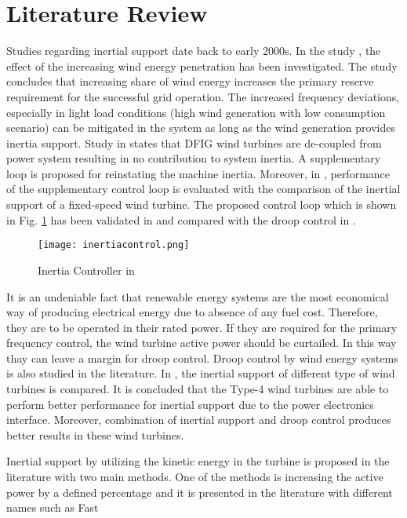 \section{Literature Review}
Studies regarding inertial support date back to early 2000s. In the study \cite{Lalor2004}, the effect of the increasing wind energy penetration has been investigated. The study concludes that increasing share of wind energy increases the primary reserve requirement for the successful grid operation. The increased frequency deviations, especially in light load conditions (high wind generation with low consumption scenario) can be mitigated in the system as long as the wind generation provides inertia support. Study in \cite{Ekanayake2003} states that DFIG wind turbines are de-coupled from power system resulting in no contribution to system inertia. A supplementary loop is proposed for reinstating the machine inertia. Moreover, in \cite{Ekanayake2004}, performance of the  supplementary control loop is evaluated with the comparison of the inertial support of a fixed-speed wind turbine. The proposed control loop which is shown in Fig. \ref{inertiacontrol} has been validated in \cite{Morren2006} and compared with the droop control in \cite{Morren2006a}.\par
\begin{figure}[h!]
	\centering
	\texttt{[image: inertiacontrol.png]}
	\caption{Inertia Controller in \cite{Morren2006a}}
	\label{inertiacontrol}
\end{figure}
It is an undeniable fact that renewable energy systems are the most economical way of producing electrical energy due to absence of any fuel cost. Therefore, they are to be operated in their rated power. If they are required for the primary frequency control, the wind turbine active power should be curtailed. In this way thay can leave a margin for droop control. Droop control by wind energy systems is also studied in the literature. In \cite{Muljadi2012}, the inertial support of different type of wind turbines is compared. It is concluded that the Type-4 wind turbines are able to perform better performance for inertial support due to the power electronics interface. Moreover, combination of inertial support and droop control produces better results in these wind turbines.\par
Inertial support by utilizing the kinetic energy in the turbine is proposed in the literature with two main methods. One of the methods is increasing the active power by a defined percentage and it is presented in the literature with different names such as Fast
